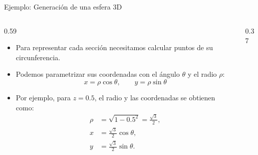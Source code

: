 \documentclass[main.tex]{subfiles}
\begin{document}
\begin{frame}{Ejemplo: Generación de una esfera 3D}
  \begin{columns}[c,onlytextwidth]
    \begin{column}{0.59\textwidth}
      \begin{itemize}
        \item Para representar cada sección necesitamos calcular
              puntos de su circunferencia.

        \item Podemos parametrizar sus coordenadas con el ángulo
              $\theta$ y el radio $\rho$:
              \[
                x=\rho\cos\theta,\qquad y=\rho\sin\theta
              \]

        \item Por ejemplo, para $z=0.5$, el radio y las
              coordenadas se obtienen como:
              \[
                \begin{aligned}
                  \rho &= \sqrt{1-0.5^2}=\frac{\sqrt{3}}{2},\\
                  x &= \frac{\sqrt{3}}{2}\cos\theta,\\
                  y &= \frac{\sqrt{3}}{2}\sin\theta.
                \end{aligned}
              \]
      \end{itemize}
    \end{column}
    \begin{column}{0.37\textwidth}
      \centering
    \end{column}
  \end{columns}
\end{frame}
\end{document}
